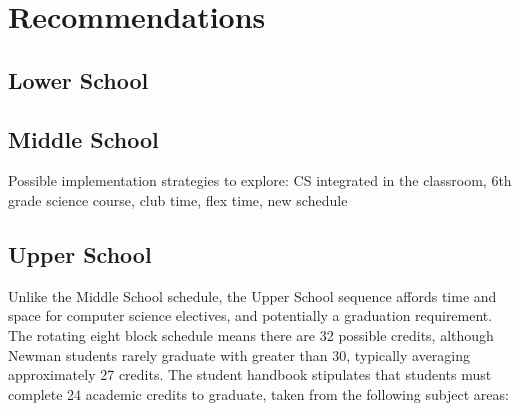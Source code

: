 
\chapter{Recommendations} %

\label{Chapter3} %



\section{Lower School}
\section{Middle School}
Possible implementation strategies to explore: CS integrated in the classroom, 6th grade science course, club time, flex time, new schedule

\section{Upper School}
Unlike the Middle School schedule, the Upper School sequence affords time and space for computer science electives, and potentially a graduation requirement. The rotating eight block schedule means there are 32 possible credits, although Newman students rarely graduate with greater than 30, typically averaging approximately 27 credits. The student handbook stipulates that students must complete 24 academic credits to graduate, taken from the following subject areas: \par

